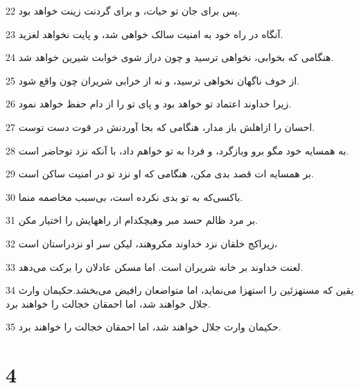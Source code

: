 \par 22 پس برای جان تو حیات، و برای گردنت زینت خواهد بود.
\par 23 آنگاه در راه خود به امنیت سالک خواهی شد، و پایت نخواهد لغزید.
\par 24 هنگامی که بخوابی، نخواهی ترسید و چون دراز شوی خوابت شیرین خواهد شد.
\par 25 از خوف ناگهان نخواهی ترسید، و نه از خرابی شریران چون واقع شود.
\par 26 زیرا خداوند اعتماد تو خواهد بود و پای تو را از دام حفظ خواهد نمود.
\par 27 احسان را ازاهلش باز مدار، هنگامی که بجا آوردنش در قوت دست توست.
\par 28 به همسایه خود مگو برو وبازگرد، و فردا به تو خواهم داد، با آنکه نزد توحاضر است.
\par 29 بر همسایه ات قصد بدی مکن، هنگامی که او نزد تو در امنیت ساکن است.
\par 30 باکسی‌که به تو بدی نکرده است، بی‌سبب مخاصمه منما.
\par 31 بر مرد ظالم حسد مبر وهیچکدام از راههایش را اختیار مکن.
\par 32 زیراکج خلقان نزد خداوند مکروهند، لیکن سر او نزدراستان است،
\par 33 لعنت خداوند بر خانه شریران است. اما مسکن عادلان را برکت می‌دهد.
\par 34 یقین که مستهزئین را استهزا می‌نماید، اما متواضعان رافیض می‌بخشد.حکیمان وارث جلال خواهند شد، اما احمقان خجالت را خواهند برد.
\par 35 حکیمان وارث جلال خواهند شد، اما احمقان خجالت را خواهند برد.
 
\chapter{4}

